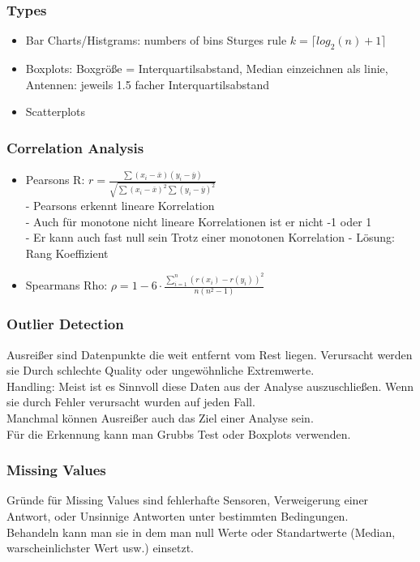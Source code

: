 \documentclass[a4paper]{scrartcl}
\begin{document}
\subsubsection{Types}
\begin{itemize}
\item Bar Charts/Histgrams: numbers of bins Sturges rule $k=\lceil log_2(n)+1\rceil$\\
\item Boxplots: Boxgröße = Interquartilsabstand, Median einzeichnen als linie, Antennen: jeweils 1.5 facher Interquartilsabstand\\
\item Scatterplots
\end{itemize}
\subsubsection{Correlation Analysis}
\begin{itemize}
\item Pearsons R: $r=\frac{\sum(x_i-\overline{x})(y_i - \overline{y})}{\sqrt{\sum(x_i-\overline{x})^2\sum(y_i - \overline{y})^2}}$\\
- Pearsons erkennt lineare Korrelation\\
- Auch für monotone nicht lineare Korrelationen ist er nicht  -1 oder 1\\
- Er kann auch fast null sein Trotz einer monotonen Korrelation
- Lösung: Rang Koeffizient\\
\item Spearmans Rho: $\rho=1-6\cdot\frac{\sum\limits^n_{i=1}(r(x_i)-r(y_i))^2}{n(n^2-1)}$\\
\end{itemize}
\subsubsection{Outlier Detection}
Ausreißer sind Datenpunkte die weit entfernt vom Rest liegen. Verursacht werden sie Durch schlechte Quality oder ungewöhnliche Extremwerte.\\
Handling: Meist ist es Sinnvoll diese Daten aus der Analyse auszuschließen. Wenn sie durch Fehler verursacht wurden auf jeden Fall.\\
Manchmal können Ausreißer auch das Ziel einer Analyse sein.\\
Für die Erkennung kann man Grubbs Test oder Boxplots verwenden.\\

\subsubsection{Missing Values}
Gründe für Missing Values sind fehlerhafte Sensoren, Verweigerung einer Antwort, oder Unsinnige Antworten unter bestimmten Bedingungen.\\
Behandeln kann man sie in dem man null Werte oder Standartwerte (Median, warscheinlichster Wert usw.) einsetzt.
\end{document}

